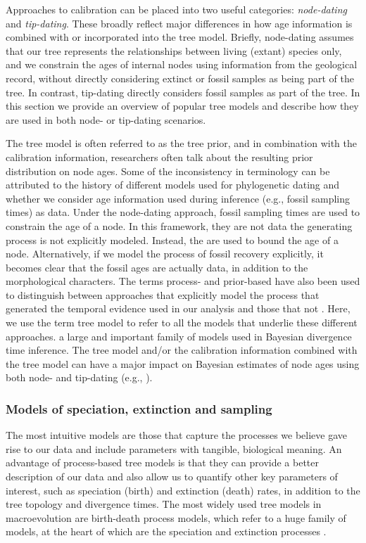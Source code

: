 Approaches to calibration can be placed into two useful categories: \textit{node-dating} and \textit{tip-dating}.
These broadly reflect major differences in how age information is combined with or incorporated into the tree model.
Briefly, node-dating assumes that our tree represents the relationships between living (extant) species only, and we constrain the ages of internal nodes using information from the geological record, without directly considering extinct or fossil samples as being part of the tree.
In contrast, tip-dating directly considers fossil samples as part of the tree.
In this section we provide an overview of popular tree models and describe how they are used in both node- or tip-dating scenarios.

The tree model is often referred to as the tree prior, and in combination with the calibration information, researchers often talk about the resulting prior distribution on node ages.
Some of the inconsistency in terminology can be attributed to the history of different models used for phylogenetic dating and whether we consider age information used during inference (e.g., fossil sampling times) as data.
Under the node-dating approach, fossil sampling times are used to constrain the age of a node.
In this framework, they are not data  the generating process is not explicitly modeled.
Instead, the  are used to bound the age of a node.
Alternatively, if we model the process of fossil recovery explicitly, it becomes clear that the fossil ages are actually data, in addition to the morphological characters.
The terms process- and prior-based have also been used to distinguish between approaches that explicitly model the  process that generated the temporal evidence used in our analysis and those that  not \citep{Landis2016}.
Here, we use the term tree model to refer to all the models that underlie these different approaches.
 a large and important family of models used in Bayesian divergence time inference.
The tree model and/or the calibration information combined with the tree model can have a major impact on Bayesian estimates of node ages using both node- and tip-dating (e.g., \citep{Ho2009,OReilly2015,matzke2016,Matschiner2017}).

\subsubsection{Models of speciation, extinction and sampling}

The most intuitive models are those that capture the processes we believe gave rise to our data and include parameters with tangible, biological meaning.
An advantage of process-based tree models is that they can provide a better description of our data and also allow us to quantify other key parameters of interest, such as speciation (birth) and extinction (death) rates, in addition to the tree topology and divergence times.
The most widely used tree models in macroevolution are birth-death process models, which refer to a huge family of models, at the heart of which are the speciation and extinction processes .

